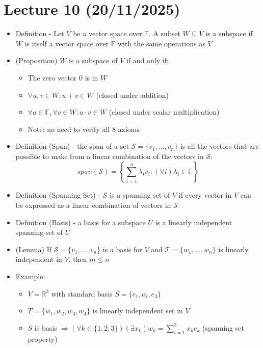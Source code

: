 \documentclass{article}
\begin{document}
\section{Lecture 10 (20/11/2025)}
\begin{itemize}
    \item Definition - Let $V$ be a vector space over $\mathbb{F}$. A subset $W \subseteq V$ is a subspace if $W$ is itself a vector space over $\mathbb{F}$ with the same operations as $V$
    \item (Proposition) $W$ is a subspace of $V$ if and only if:
    \begin{itemize}
        \item The zero vector 0 is in $W$
        \item $\forall u,v \in W : u+v \in W$ (closed under addition)
        \item $\forall a \in \mathbb{F}, \forall v \in W : a \cdot v \in W$ (closed under scalar multiplication)
        \item Note: no need to verify all 8 axioms
    \end{itemize}
    \item Definition (Span) - the span of a set $\mathcal{S} = \{v_1,\dots, v_n\}$ is all the vectors that are possible to make from a linear combination of the vectors in $\mathcal{S}$:
    \[
    span(\mathcal{S}) = \left\{ \sum_{i=1}^n \lambda_iv_i : (\forall i) \lambda_i \in \mathbb{F} \right\}
    \]
    \item Definition (Spanning Set) - $\mathcal{S}$ is a spanning set of $V$ if every vector in $V$ can be expressed as a linear combination of vectors in $\mathcal{S}$
    \item Definition (Basis) - a basis for a subspace $U$ is a linearly independent spanning set of $U$
    \item (Lemma) If $\mathcal{S} = \{ v_1,\dots, v_n\}$ is a basis for $V$ and $\mathcal{T} = \{w_1,\dots,w_n\}$ is linearly independent in $V$, then $m \le n$
    \item Example:
    \begin{itemize}
        \item $V=\mathbb{R}^3$ with standard basis $S=\{ e_1,e_2,e_3 \}$
        \item $T=\{ w_1,w_2,w_3,w_4 \}$ is linearly independent set in $V$
        \item $S$ is basis $\Rightarrow (\forall k \in \{1,2,3\})(\exists x_k) w_k = \sum_{i=1}^3 x_ke_k$ (spanning set property)
        \begin{itemize}

\end{itemize}
\end{itemize}
\end{itemize}
\end{document}
